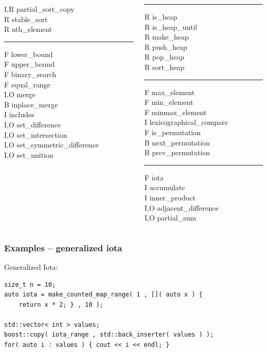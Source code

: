 \documentclass{beamer}
\newcommand{\heading}[1]{\frametitle{#1}}
\begin{document}
{\begin{columns}[T]
\begin{column}{0.3\textwidth}
      I,R partial\_sort\_copy \\
      R stable\_sort \\
      R nth\_element \\
      \hrule
      F lower\_bound \\
      F upper\_bound \\
      F binary\_search \\
      F equal\_range \\
      I,O merge \\
      B inplace\_merge \\
      I includes \\
      I,O set\_difference \\
      I,O set\_intersection \\
      I,O set\_symmetric\_difference \\
      I,O set\_unition 
    \end{column}
    \begin{column}{0.3\textwidth}
      \hrule
      R is\_heap \\
      R is\_heap\_until \\
      R make\_heap \\
      R push\_heap \\
      R pop\_heap \\
      R sort\_heap \\
      \hrule
      F max\_element \\
      F min\_element \\
      F minmax\_element \\
      I lexicographical\_compare \\
      F is\_permutation \\
      B next\_permutation \\
      B prev\_permutation \\
      \hrule
      F iota \\
      I accumulate \\
      I inner\_product \\
      I,O adjacent\_difference \\
      I,O partial\_sum
   \end{column}
  \end{columns}


}







\begin{frame}[fragile]
 \heading{Examples -- generalized iota}
 
 Generalized Iota:
\begin{lstlisting}[basicstyle=\scriptsize\ttfamily]
size_t n = 10;
auto iota = make_counted_map_range( 1 , []( auto x ) {
    return x * 2; } , 10 );

std::vector< int > values;
boost::copy( iota_range , std::back_inserter( values ) );
for( auto i : values ) { cout << i << endl; }
\end{lstlisting}

\end{frame}
\end{document}
